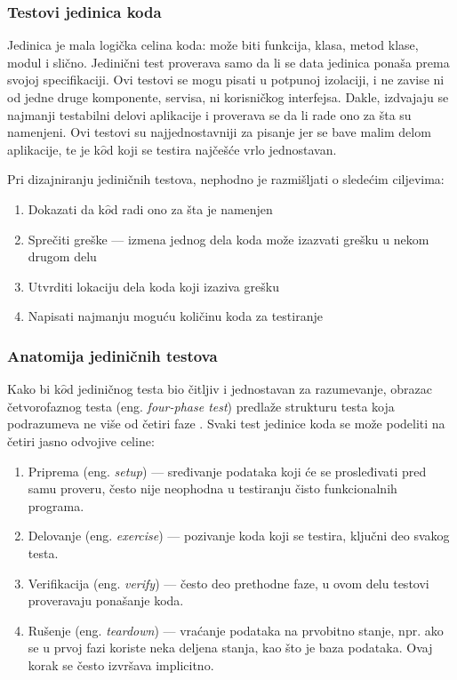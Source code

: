 \documentclass[12pt,oneside]{memoir}
\begin{document}
\subsubsection{Testovi jedinica koda}
\par Jedinica je mala logička celina koda: može biti funkcija, klasa, metod klase, modul i slično. Jedinični test proverava samo da li se data jedinica ponaša prema svojoj specifikaciji. Ovi testovi se mogu pisati u potpunoj izolaciji, i ne zavise ni od jedne druge komponente, servisa, ni korisničkog interfejsa. Dakle, izdvajaju se najmanji testabilni delovi aplikacije i proverava se da li rade ono za šta su namenjeni. Ovi testovi su najjednostavniji za pisanje jer se bave malim delom aplikacije, te je k$\hat{o}$d koji se testira najčešće vrlo jednostavan. 
\par Pri dizajniranju jediničnih testova, nephodno je razmišljati o sledećim ciljevima: 
\begin{enumerate}
\item Dokazati da k$\hat{o}$d radi ono za šta je namenjen
\item Sprečiti greške --- izmena jednog dela koda može izazvati grešku u nekom drugom delu
\item Utvrditi lokaciju dela koda koji izaziva grešku
\item Napisati najmanju moguću količinu koda za testiranje
\end{enumerate}

\subsubsection{Anatomija jediničnih testova}
\par Kako bi k$\hat{o}$d jediničnog testa bio čitljiv i jednostavan za razumevanje, obrazac četvorofaznog testa (eng. \emph{four-phase test}) predlaže strukturu testa koja podrazumeva ne više od četiri faze \cite{4phase}. Svaki test jedinice koda se može podeliti na četiri jasno odvojive celine:  
\begin{enumerate}
\item Priprema (eng. \emph{setup}) --- sređivanje podataka koji će se prosleđivati pred samu proveru, često nije neophodna u testiranju čisto funkcionalnih programa.
\item Delovanje (eng. \emph{exercise}) --- pozivanje koda koji se testira, ključni deo svakog testa.
\item Verifikacija (eng. \emph{verify}) --- često deo prethodne faze, u ovom delu testovi proveravaju ponašanje koda. 
\item Rušenje (eng. \emph{teardown}) --- vraćanje podataka na prvobitno stanje, npr. ako se u prvoj fazi koriste neka deljena stanja, kao što je baza podataka. Ovaj korak se često izvršava implicitno. 
\end{enumerate}
\end{document}
